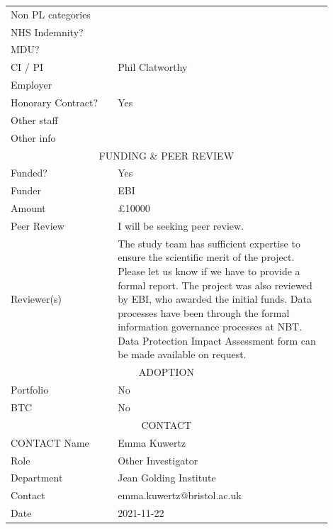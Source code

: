 \documentclass{article}
\begin{document}
\begin{small}
\begin{center}
\begin{tabular}{p{0.3\linewidth}p{0.6\linewidth}}
      \hline
      Non PL categories & \\
      NHS Indemnity? & \\
      MDU? & \\
      CI / PI &  Phil Clatworthy\\
      Employer & \\
      Honorary Contract? & Yes\\
      Other staff & \\
      Other info & \\
      \hline\hline
      \multicolumn{2}{c}{FUNDING \& PEER REVIEW}\\
      \hline
      Funded? &  Yes\\
      Funder &  EBI\\
      Amount &  £10000\\
      Peer Review &  I will be seeking peer review.\\
      Reviewer(s) &  The study team has sufficient expertise to ensure
                    the scientific merit of the project. Please let us
                    know if we have to provide a formal report. The project was also reviewed by EBI, who awarded the initial funds. Data processes have been through the formal information governance processes at NBT. Data Protection Impact Assessment form can be made available on request.\\
      \hline\hline
      \multicolumn{2}{c}{ADOPTION}\\
      \hline
      Portfolio &  No\\
      BTC &  No\\
      \hline\hline
      \multicolumn{2}{c}{CONTACT}\\
      \hline
      CONTACT
      Name &  Emma Kuwertz\\
      Role &  Other Investigator\\
      Department &  Jean Golding Institute\\
      Contact &  emma.kuwertz@bristol.ac.uk\\
      Date &  2021-11-22\\
      \hline
    \end{tabular}
  \end{center}
\end{small}

\printbibliography
\end{document}

